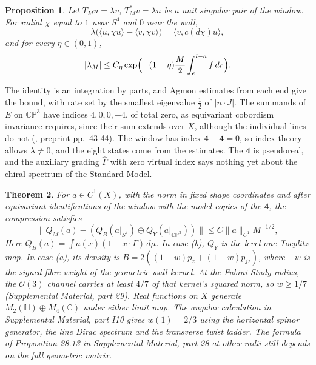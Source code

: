 \documentclass[aps,prd,reprint,onecolumn,nofootinbib,amsmath,amssymb,floatfix]{revtex4-2}
\theoremstyle{plain}
\newtheorem{theorem}{Theorem}
\newtheorem{proposition}[theorem]{Proposition}
\newcommand{\C}{\mathbb C}
\renewcommand{\H}{\mathbb H}
\newcommand{\CP}{\mathbb{CP}}
\newcommand{\supp}[1]{Supplemental Material, part #1}
\begin{document}
\begin{proposition}\label{prop:tunnel}
Let $T_Mu=\lambda v$, $T_M^*v=\lambda u$ be a unit singular pair of the window. For radial $\chi$ equal to $1$ near $S^4$ and $0$ near the wall,
\begin{equation}
\lambda\bigl(\langle u,\chi u\rangle-\langle v,\chi v\rangle\bigr)=\langle v,c(d\chi)u\rangle,
\end{equation}
and for every $\eta\in(0,1)$,
\begin{equation}
|\lambda_M|\le C_\eta\exp\Bigl(-(1-\eta)\frac M2\int_e^{l-a}f\,dr\Bigr).
\end{equation}
\end{proposition}

The identity is an integration by parts, and Agmon estimates from each end give the bound, with rate set by the smallest eigenvalue $\frac12$ of $|n\cdot J|$. The summands of $E$ on $\CP^3$ have indices $4,0,0,-4$, of total zero, as equivariant cobordism invariance requires, since their sum extends over $X$, although the individual lines do not (\cite{Witten1983}, preprint pp.~43-44). The window has index $\mathbf 4-\mathbf 4=0$, so index theory allows $\lambda\neq0$, and the eight states come from the estimates. The $\mathbf 4$ is pseudoreal, and the auxiliary grading $\hat\Gamma$ with zero virtual index says nothing yet about the chiral spectrum of the Standard Model.

\begin{theorem}\label{thm:compression}
For $a\in C^1(X)$, with the norm in fixed shape coordinates and after equivariant identifications of the window with the model copies of the $\mathbf 4$, the compression satisfies
\begin{equation}
\|Q_M(a)-(Q_B(a|_{S^4})\oplus Q_Y(a|_{\CP^3}))\|\le C\|a\|_{C^1}M^{-1/2},
\end{equation}
Here $Q_B(a)=\int a(x)(1-x\cdot\Gamma)\,d\mu$. In case (b), $Q_Y$ is the level-one Toeplitz map. In case (a), its density is $B=2((1+w)p_z+(1-w)p_{jz})$, where $-w$ is the signed fibre weight of the geometric wall kernel. At the Fubini-Study radius, the $\mathcal O(3)$ channel carries at least $4/7$ of that kernel's squared norm, so $w\ge1/7$ (\supp{29}). Real functions on $X$ generate $M_2(\H)\oplus M_4(\C)$ under either limit map. The angular calculation in \supp{I10} gives $w(1)=2/3$ using the horizontal spinor generator, the line Dirac spectrum and the transverse twist ladder. The formula of Proposition 28.13 in \supp{28} at other radii still depends on the full geometric matrix.
\end{theorem}
\end{document}
